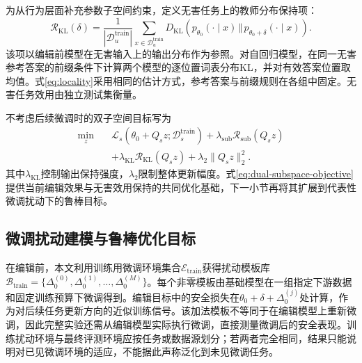 为从行为层面补充参数子空间约束，定义无害任务上的教师分布保持项：
\begin{equation}
  \mathcal{R}_{\mathrm{KL}}(\delta)
  =\frac{1}{|\mathcal{D}_{u}^{\mathrm{train}}|}
  \sum_{x\in\mathcal{D}_{u}^{\mathrm{train}}}
  D_{\mathrm{KL}}\!\left(
  p_{\theta_0}(\cdot\mid x)
  \,\Vert\,
  p_{\theta_0+\delta}(\cdot\mid x)
  \right).
  \label{eq:utility-kd}
\end{equation}
该项以编辑前模型在无害输入上的输出分布作为参照。对自回归模型，在同一无害参考答案的前缀条件下计算两个模型的逐位置词表分布KL，并对有效答案位置取均值。式\eqref{eq:locality}采用相同的估计方式，参考答案与前缀规则在各组中固定。无害任务效用由独立测试集衡量。

不考虑后续微调时的双子空间目标写为
\begin{equation}
 \begin{aligned}
  \min_z\quad&\mathcal L_s(\theta_0+Q_s z;\mathcal D_s^{\mathrm{train}})
  +\lambda_{\mathrm{sub}}\mathcal R_{\mathrm{sub}}(Q_s z)\\
  &+\lambda_{\mathrm{KL}}\mathcal R_{\mathrm{KL}}(Q_s z)
  +\lambda_2\|Q_s z\|_2^2.
 \end{aligned}
  \label{eq:dual-subspace-objective}
\end{equation}
其中$\lambda_{\mathrm{KL}}$控制输出保持强度，$\lambda_2$限制整体更新幅度。式\eqref{eq:dual-subspace-objective}提供当前编辑效果与无害效用保持的共同优化基础，下一小节再将其扩展到代表性微调扰动下的鲁棒目标。

\subsection{微调扰动建模与鲁棒优化目标}

在编辑前，本文利用训练用微调环境集合$\mathcal{E}_{\mathrm{train}}$获得扰动模板库$\mathcal{B}_{\mathrm{train}}=\{\Delta_{0}^{(0)},\Delta_{0}^{(1)},\ldots,\Delta_{0}^{(M)}\}$。每个非零模板由基础模型在一组指定下游数据和固定训练预算下微调得到。编辑目标中的安全损失在$\theta_0+\delta+\Delta_{0}^{(j)}$处计算，作为对后续任务更新方向的近似训练信号。该加法模板不等同于在编辑模型上重新微调，因此完整实验还需从编辑模型实际执行微调，直接测量微调后的安全表现。训练扰动环境与最终评测环境应按任务或数据源划分；若两者完全相同，结果只能说明对已见微调环境的适应，不能据此声称泛化到未见微调任务。

